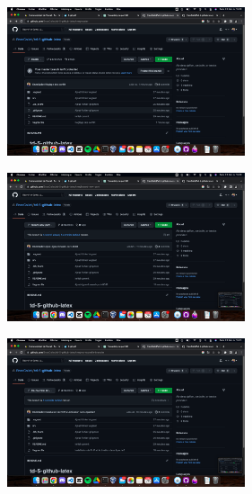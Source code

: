 \documentclass[12pt]{article}
\begin{document}
\begin{center}
  \includegraphics[width=7cm]{Image-TD-Git-5/Branche-Master.png}
\end{center}

\vspace{0.3cm}

\begin{center}
  \includegraphics[width=7cm]{Image-TD-Git-5/Branche-forward.png}
\end{center}

\vspace{0.3cm}

\begin{center}
  \includegraphics[width=7cm]{Image-TD-Git-5/Barnche-ma-nouvelle.png}
\end{center}
\end{document}
